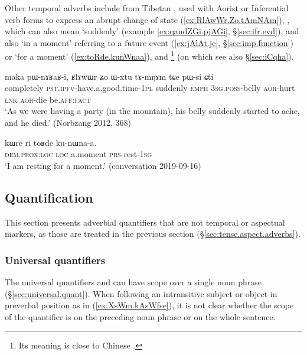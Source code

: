 Other temporal adverbs include  from Tibetan , used with Aorist or Inferential verb forms to express an abrupt change of state  (\ref{ex:RlAwWr.Zo.tAmNAm}), , which can also mean `suddenly' (example \ref{ex:qandZGi.pjAGi}, §\ref{sec:ifr.evd}), and also  `in a moment' referring to a future event (\ref{ex:jAlAt.je}, §\ref{sec:imp.function}) or `for a moment' (\ref{ex:toRde.kunWnaa}), and \footnote{Its meaning is close to Chinese .} (on which see also §\ref{sec:iCqha}).


\begin{exe}
\ex \label{ex:RlAwWr.Zo.tAmNAm}
\gll maka pɯ-nɤʁaʁ-i, ʁlɤwɯr ʑo ɯ-xtu tɤ-mŋɤm tɕe pɯ-si ɕti  \\
completely \textsc{pst}.\textsc{ipfv}-have.a.good.time-\textsc{1pl} suddenly \textsc{emph} \textsc{3sg}.\textsc{poss}-belly \textsc{aor}-hurt \textsc{lnk} \textsc{aor}-die be.\textsc{aff}:\textsc{fact} \\
\glt `As we were having a party (in the mountain), his belly suddenly started to ache, and he died.' (Norbzang 2012, 368)
\end{exe}
 

\begin{exe}
\ex \label{ex:toRde.kunWnaa}
\gll kɯre ri toʁde ku-nɯna-a. \\
\textsc{dem}.\textsc{prox}:\textsc{loc} \textsc{loc} a.moment \textsc{prs}-rest-\textsc{1sg} \\
\glt `I am resting for a moment.' (conversation 2019-09-16)
\end{exe}

\subsection{Quantification} \label{sec:quantification.adverbs}
  This section presents adverbial quantifiers that are not temporal or aspectual markers, as those are treated in the previous section (§\ref{sec:tense.aspect.adverbs}).
 
\subsubsection{Universal quantifiers}  \label{sec:universal.quantification.adverbs}
The universal quantifiers  and  can have scope over a single noun phrase  (§\ref{sec:universal.quant}). When following an intransitive subject or object in preverbal position as in (\ref{ex:XsWm.kAsWfse}), it is not clear whether the scope of the quantifier is on the preceding noun phrase or on the whole sentence.  


